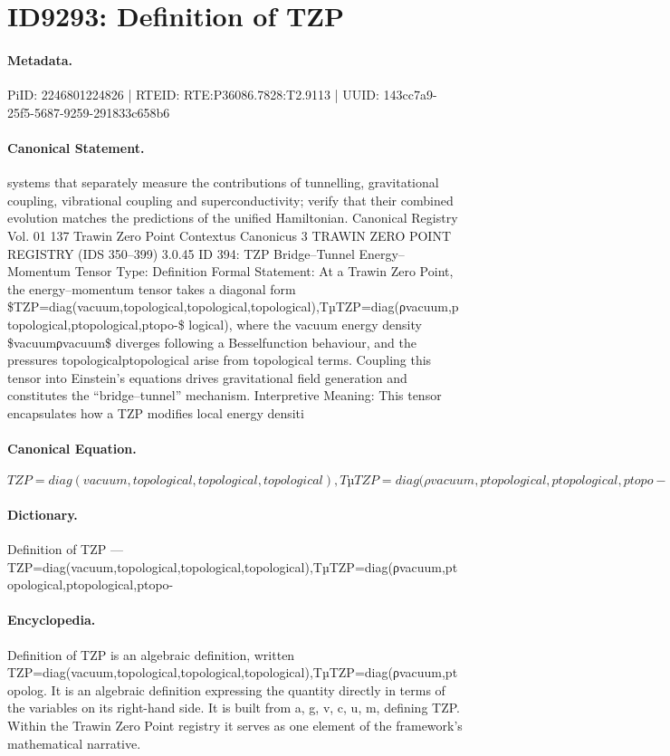 \section*{ID9293: Definition of TZP}
\paragraph{Metadata.}
PiID: 2246801224826 | RTEID: RTE:P36086.7828:T2.9113 | UUID: 143cc7a9-25f5-5687-9259-291833c658b6

\paragraph{Canonical Statement.}
systems that separately measure the contributions of tunnelling, gravitational coupling, vibrational coupling and superconductivity; verify that their combined evolution matches the predictions of the unified Hamiltonian. Canonical Registry Vol. 01 137 Trawin Zero Point Contextus Canonicus 3 TRAWIN ZERO POINT REGISTRY (IDS 350–399) 3.0.45 ID 394: TZP Bridge–Tunnel Energy–Momentum Tensor Type: Definition Formal Statement: At a Trawin Zero Point, the energy–momentum tensor takes a diagonal form \$TZP=diag(vacuum,topological,topological,topological),TµTZP=diag(ρvacuum,ptopological,ptopological,ptopo-\$ logical), where the vacuum energy density \$vacuumρvacuum\$ diverges following a Besselfunction behaviour, and the pressures topologicalptopological arise from topological terms. Coupling this tensor into Einstein’s equations drives gravitational field generation and constitutes the “bridge–tunnel” mechanism. Interpretive Meaning: This tensor encapsulates how a TZP modifies local energy densiti

\paragraph{Canonical Equation.}
\[
TZP=diag(vacuum,topological,topological,topological),TµTZP=diag(ρvacuum,ptopological,ptopological,ptopo-
\]

\paragraph{Dictionary.}
Definition of TZP — TZP=diag(vacuum,topological,topological,topological),TµTZP=diag(ρvacuum,ptopological,ptopological,ptopo-

\paragraph{Encyclopedia.}
Definition of TZP is an algebraic definition, written TZP=diag(vacuum,topological,topological,topological),TµTZP=diag(ρvacuum,ptopolog. It is an algebraic definition expressing the quantity directly in terms of the variables on its right-hand side. It is built from a, g, v, c, u, m, defining TZP. Within the Trawin Zero Point registry it serves as one element of the framework's mathematical narrative.
